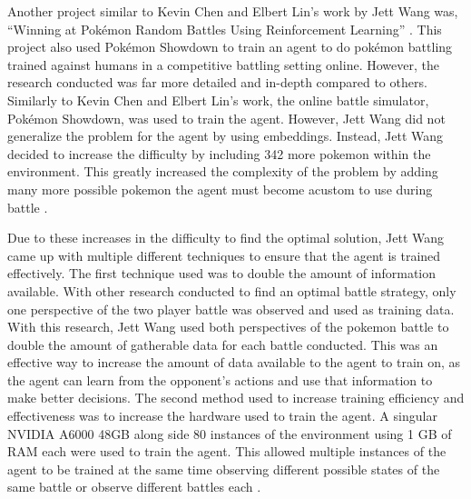 Another project similar to Kevin Chen and Elbert Lin's work by Jett Wang was, ``Winning at Pokémon Random Battles Using Reinforcement Learning'' \cite{wang2024winning}. This project also used Pokémon Showdown to train an agent to do pokémon battling trained against humans in a competitive battling setting online. However, the research conducted was far more detailed and in-depth compared to others. Similarly to Kevin Chen and Elbert Lin's work, the online battle simulator, Pokémon Showdown, was used to train the agent. However, Jett Wang did not generalize the problem for the agent by using embeddings. Instead, Jett Wang decided to increase the difficulty by including 342 more pokemon within the environment. This greatly increased the complexity of the problem by adding many more possible pokemon the agent must become acustom to use during battle \cite{wang2024winning}. 

Due to these increases in the difficulty to find the optimal solution, Jett Wang came up with multiple different techniques to ensure that the agent is trained effectively. The first technique used was to double the amount of information available. With other research conducted to find an optimal battle strategy, only one perspective of the two player battle was observed and used as training data. With this research, Jett Wang used both perspectives of the pokemon battle to double the amount of gatherable data for each battle conducted. This was an effective way to increase the amount of data available to the agent to train on, as the agent can learn from the opponent's actions and use that information to make better decisions. The second method used to increase training efficiency and effectiveness was to increase the hardware used to train the agent.  A singular NVIDIA A6000 48GB along side 80 instances of the environment using 1 GB of RAM each were used to train the agent. This allowed multiple instances of the agent to be trained at the same time observing different possible states of the same battle or observe different battles each \cite{wang2024winning}. 
 
